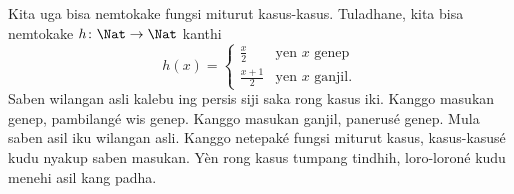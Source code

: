 \documentclass[../../../include/open-logic-section]{subfiles}
\begin{document}
\begin{ex}
Kita uga bisa nemtokake fungsi miturut
kasus-kasus. Tuladhane, kita bisa
nemtokake $h \colon \Nat \to \Nat$ kanthi
\[
h(x) =
\begin{cases}
  \frac{x}{2} & \text{yen $x$ genep} \\
  \frac{x+1}{2} & \text{yen $x$ ganjil.}
\end{cases}
\]
Saben wilangan asli kalebu ing persis siji saka rong kasus iki.
Kanggo masukan genep, pambilangé wis genep. Kanggo masukan ganjil,
panerusé genep. Mula saben asil iku wilangan asli.
Kanggo netepaké fungsi miturut kasus, kasus-kasusé kudu nyakup
saben masukan. Yèn rong kasus tumpang tindhih, loro-loroné kudu menehi asil kang padha.
\end{ex}
\end{document}
